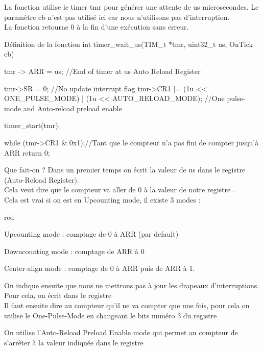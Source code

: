 La fonction utilise le timer tmr pour générer une attente de us microsecondes. Le paramètre cb n'est pas utilisé ici car nous n'utilisons pas d'interruption.\\
La fonction retourne 0 à la fin d'une exécution sans erreur. \\

\begin{Cpp}{Définition de la fonction} 
int timer_wait_us(TIM_t *tmr, uint32_t us, OnTick cb) 
{

tmr -> ARR = us;			//End of timer at us   Auto Reload Register
		
tmr->SR = 0; 														//No update interrupt flag
tmr->CR1 |=  (1u << ONE_PULSE_MODE) | (1u << AUTO_RELOAD_MODE);		//One pulse-mode and Auto-reload preload enable

timer_start(tmr);

while (tmr->CR1 & 0x1){};//Tant que le compteur n'a pas fini de compter jusqu'à ARR
return 0;
}
\end{Cpp}

Que fait-on ? Dans un premier temps on écrit la valeur de us dans le registre  (Auto-Reload Register).\\
Cela veut dire que le compteur va aller de 0 à la valeur de notre registre .\\
Cela est vrai si on est en Upcounting mode, il existe 3 modes : \\

\begin{items}{red}{\Triangle}
\item Upcounting mode : comptage de 0 à ARR (par default)
\item Downcounting mode : comptage de ARR à 0 
\item Center-align mode : comptage de 0 à ARR puis de ARR à 1.
\end{items}

On indique ensuite que nous ne mettrons pas à jour les drapeaux d'interruptions. Pour cela, on écrit  dans le registre \\
Il faut ensuite dire au compteur qu'il ne va compter que une fois, pour cela on utilise le One-Pulse-Mode en changeant le bits numéro 3 du registre  


On utilise l'Auto-Reload Preload Enable  mode qui permet au compteur de s'arrêter à la valeur indiquée dans le registre 

